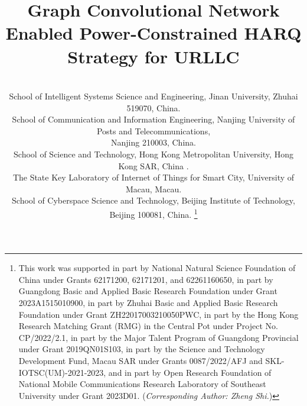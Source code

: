 \documentclass[conference]{IEEEtran}
\begin{document}
\IEEEoverridecommandlockouts
\title{Graph Convolutional Network Enabled Power-Constrained HARQ Strategy for URLLC}

\author{
\\
School of Intelligent Systems Science and Engineering, Jinan University, Zhuhai 519070, China.\\
School of Communication and Information Engineering, Nanjing University of Posts and Telecommunications, \\Nanjing 210003, China.\\
School of Science and Technology, Hong Kong Metropolitan University, Hong Kong SAR, China .\\
The State Key Laboratory of Internet of Things for Smart City, University of Macau, Macau.\\
School of Cyberspace Science and Technology, Beijing Institute of Technology, Beijing 100081, China.
\thanks {This work was supported in part by National Natural Science Foundation of China under Grants 62171200, 62171201, and 62261160650, in part by Guangdong Basic and Applied Basic Research Foundation under Grant 2023A1515010900, in part by Zhuhai Basic and Applied Basic Research Foundation under Grant ZH22017003210050PWC, in part by the Hong Kong Research Matching Grant (RMG) in the Central Pot under Project No. CP/2022/2.1, in part by the Major Talent Program of Guangdong Provincial under Grant 2019QN01S103, in part by the Science and Technology Development Fund, Macau SAR under Grants 0087/2022/AFJ and SKL-IOTSC(UM)-2021-2023, and in part by Open Research Foundation of National Mobile Communications Research Laboratory of Southeast University under Grant 2023D01. (\emph{Corresponding Author: Zheng Shi.})}
}
\end{document}
